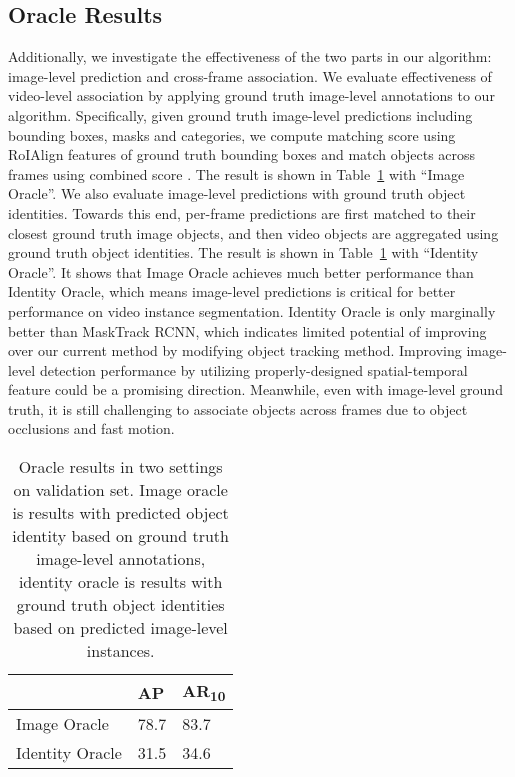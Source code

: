 \subsection{Oracle Results}

Additionally, we investigate the effectiveness of the two parts in our algorithm: image-level prediction and cross-frame association. We evaluate effectiveness of video-level association by applying ground truth image-level annotations to our algorithm. Specifically, given ground truth image-level predictions including bounding boxes, masks and categories, we compute matching score  using RoIAlign features of ground truth bounding boxes and match objects across frames using combined score . The result is shown in Table~\ref{tab:oracle} with ``Image Oracle''. We also evaluate image-level predictions with ground truth object identities. Towards this end, per-frame predictions are first matched to their closest ground truth image objects, and then video objects are aggregated using ground truth object identities. The result is shown in Table~\ref{tab:oracle} with ``Identity Oracle''. It shows that Image Oracle achieves much better performance than Identity Oracle, which means image-level predictions is critical for better performance on video instance segmentation. Identity Oracle is only marginally better than MaskTrack RCNN, which indicates limited potential of improving over our current method by modifying object tracking method. Improving image-level detection performance by utilizing properly-designed spatial-temporal feature could be a promising direction. Meanwhile, even with image-level ground truth, it is still challenging to associate objects across frames due to object occlusions and fast motion.






\begin{table}[t]
\centering
\caption{Oracle results in two settings on validation set. Image oracle is results with predicted object identity based on ground truth image-level annotations, identity oracle is results with  ground truth object identities based on predicted image-level instances.}
\label{tab:oracle}
\begin{tabular}{|l|l|l|}
\hline
                & AP   & AR\textsubscript{10} \\ \hline
Image Oracle    & 78.7 & 83.7    \\ \hline
Identity Oracle & 31.5 & 34.6    \\ \hline
\end{tabular}
\end{table}